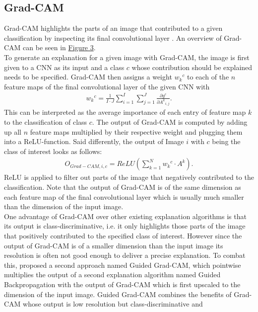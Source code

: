 \documentclass{article}
\begin{document}
\subsection{Grad-CAM}
Grad-CAM highlights the parts of an image that contributed to a given classification by inspecting its
final convolutional layer \cite{Selvaraju_2017_ICCV}. An overview of Grad-CAM can be seen in \hyperref[fig:gradcam]{Figure 3}. \\
To generate an explanation for a given image with Grad-CAM, the image is first given to a CNN as its input
and a class $c$ whose contribution should be explained needs to be specified. Grad-CAM then assigns a weight
${w_k}^c$ to each of the $n$ feature maps of the final convolutional layer of the given CNN with
\begin{align*}
    {w_k}^c = \frac{1}{I \cdot J} \sum\limits_{i=1}^{I} \sum\limits_{j=1}^J \frac{\partial y^c}{\partial {A^k}_{i,j}}.
\end{align*}
This can be interpreted as the average importance of each entry of feature map $k$ to the classification of class $c$.
The output of Grad-CAM is computed by adding up all $n$ feature maps multiplied by their respective weight and plugging
them into a ReLU-function. Said differently, the output of Image $i$ with $c$ being the class of interest looks as follows:
\begin{align*}
    O_{Grad-CAM, i, c} = ReLU(\sum\limits_{k=1}^N {w_k}^c \cdot A^k).
\end{align*}
ReLU is applied to filter out parts of the image that
negatively contributed to the classification. Note that the output of Grad-CAM is of the same dimension as each
feature map of the final convolutional layer which is usually much smaller than the dimension of the input image. \\
One advantage of Grad-CAM over other existing explanation algorithms is that its output is class-discriminative,
i.e. it only highlights those parts of the image that positively contributed to the specified class of interest.
However since the output of Grad-CAM is of a smaller dimension than the input image its resolution is often not good enough
to deliver a precise explanation. To combat this, \cite{Selvaraju_2017_ICCV} proposed a second approach named Guided Grad-CAM,
which pointwise multiplies the output of a second explanation algorithm named Guided Backpropagation \cite{springenberg2015striving}
with the output of Grad-CAM which is first upscaled to the dimension of the input image. 
Guided Grad-CAM combines the benefits of Grad-CAM whose output is low resolution but class-discriminative and
\end{document}
